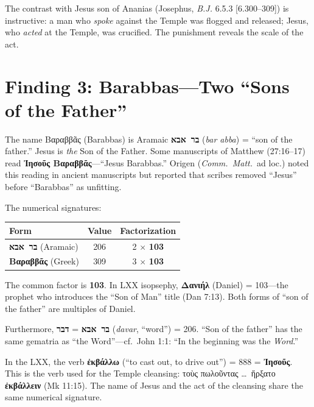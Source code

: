 \documentclass[12pt,a4paper]{article}
\begin{document}
The contrast with Jesus son of Ananias (Josephus, \textit{B.J.} 6.5.3 [6.300--309]) is instructive: a man who \textit{spoke} against the Temple was flogged and released; Jesus, who \textit{acted} at the Temple, was crucified. The punishment reveals the scale of the act.

\section{Finding 3: Barabbas---Two ``Sons of the Father''}
\label{sec:barabbas}

The name Βαραββᾶς (Barabbas) is Aramaic \textbf{בר~אבא} (\textit{bar abba}) = ``son of the father.'' Jesus is \textit{the} Son of the Father. Some manuscripts of Matthew (27:16--17) read \textbf{Ἰησοῦς Βαραββᾶς}---``Jesus Barabbas.'' Origen (\textit{Comm.\ Matt.}\ ad loc.) noted this reading in ancient manuscripts but reported that scribes removed ``Jesus'' before ``Barabbas'' as unfitting.

The numerical signatures:

\begin{center}
\begin{tabular}{lcc}
\toprule
\textbf{Form} & \textbf{Value} & \textbf{Factorization} \\
\midrule
\textbf{בר~אבא} (Aramaic) & 206 & 2 $\times$ \textbf{103} \\
\textbf{Βαραββᾶς} (Greek) & 309 & 3 $\times$ \textbf{103} \\
\bottomrule
\end{tabular}
\end{center}

The common factor is \textbf{103}. In LXX isopsephy, \textbf{Δανιήλ} (Daniel) = 103---the prophet who introduces the ``Son of Man'' title (Dan 7:13). Both forms of ``son of the father'' are multiples of Daniel.

Furthermore, \textbf{בר~אבא} = \textbf{דבר} (\textit{davar}, ``word'') = 206. ``Son of the father'' has the same gematria as ``the Word''---cf.\ John 1:1: ``In the beginning was the \textit{Word}.''

In the LXX, the verb \textbf{ἐκβάλλω} (``to cast out, to drive out'') = 888 = \textbf{Ἰησοῦς}. This is the verb used for the Temple cleansing: τοὺς πωλοῦντας \ldots\ ἤρξατο \textbf{ἐκβάλλειν} (Mk 11:15). The name of Jesus and the act of the cleansing share the same numerical signature.
\end{document}
